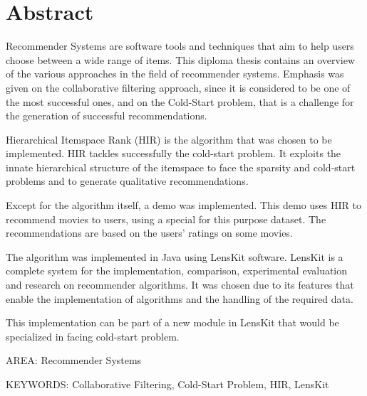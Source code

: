 \chapter*{\en Abstract}

{\en Recommender Systems are software tools and techniques that aim to help users choose between a wide range of items. This diploma thesis contains an overview of the various approaches in the field of recommender systems. Emphasis was given on the collaborative filtering approach, since it is considered to be one of the most successful ones, and on the Cold-Start problem, that is a challenge for the generation of successful recommendations. \par
Hierarchical Itemspace Rank (HIR) is the algorithm that was chosen to be implemented. HIR tackles successfully the cold-start problem. It exploits the innate hierarchical structure of the itemspace to face the sparsity and cold-start problems and to generate qualitative recommendations.\par
Except for the algorithm itself, a demo was implemented. This demo uses HIR to recommend movies to users, using a special for this purpose dataset. The recommendations are based on the users' ratings on some movies. \par
The algorithm was implemented in Java using LensKit software. LensKit is a complete system for the implementation, comparison, experimental evaluation and research on recommender algorithms. It was chosen due to its features that enable the implementation of algorithms and the handling of the required data.\par
This implementation can be part of a new module in LensKit that would be specialized in facing cold-start problem.\\ 

\par AREA: Recommender Systems
\par KEYWORDS: Collaborative Filtering, Cold-Start Problem, HIR, LensKit} \\ \\
